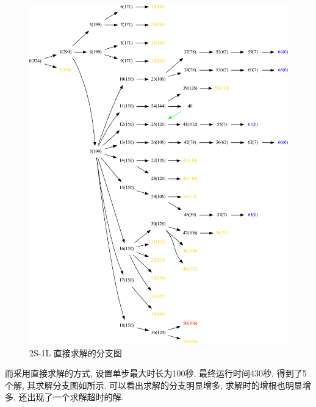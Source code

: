 \begin{figure}[htbp]
\centering
\includegraphics[width=\textwidth]{fig/2S1L-dir-number.pdf}
\caption{2S-1L 直接求解的分支图}\label{sb2-d}
\end{figure}

而采用直接求解的方式, 设置单步最大时长为100秒, 最终运行时间430秒, 得到了5个解, 其求解分支图如所示. 可以看出求解的分支明显增多, 求解时的增根也明显增多, 还出现了一个求解超时的解.  

